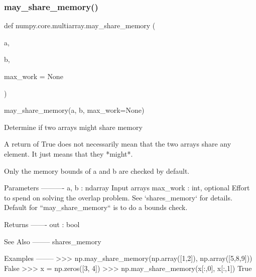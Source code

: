  \mbox{\label{namespacenumpy_1_1core_1_1multiarray_a7d65467076a29d5822e5eba27f5bf779}} 
\subsubsection{\texorpdfstring{may\+\_\+share\+\_\+memory()}{may\_share\_memory()}}
{\footnotesize\ttfamily def numpy.\+core.\+multiarray.\+may\+\_\+share\+\_\+memory (\begin{DoxyParamCaption}\item[{}]{a,  }\item[{}]{b,  }\item[{}]{max\+\_\+work = {\ttfamily None} }\end{DoxyParamCaption})}

\begin{DoxyVerb}may_share_memory(a, b, max_work=None)

Determine if two arrays might share memory

A return of True does not necessarily mean that the two arrays
share any element.  It just means that they *might*.

Only the memory bounds of a and b are checked by default.

Parameters
----------
a, b : ndarray
    Input arrays
max_work : int, optional
    Effort to spend on solving the overlap problem.  See
    `shares_memory` for details.  Default for ``may_share_memory``
    is to do a bounds check.

Returns
-------
out : bool

See Also
--------
shares_memory

Examples
--------
>>> np.may_share_memory(np.array([1,2]), np.array([5,8,9]))
False
>>> x = np.zeros([3, 4])
>>> np.may_share_memory(x[:,0], x[:,1])
True\end{DoxyVerb}
 \mbox{\label{namespacenumpy_1_1core_1_1multiarray_a71e0e2690ab43de1a49302bbdd24c0ca}} 
